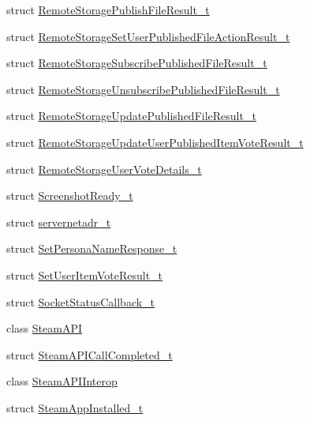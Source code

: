 \begin{DoxyCompactItemize}
\item 
struct \hyperlink{structValve_1_1Steamworks_1_1RemoteStoragePublishFileResult__t}{Remote\+Storage\+Publish\+File\+Result\+\_\+t}
\item 
struct \hyperlink{structValve_1_1Steamworks_1_1RemoteStorageSetUserPublishedFileActionResult__t}{Remote\+Storage\+Set\+User\+Published\+File\+Action\+Result\+\_\+t}
\item 
struct \hyperlink{structValve_1_1Steamworks_1_1RemoteStorageSubscribePublishedFileResult__t}{Remote\+Storage\+Subscribe\+Published\+File\+Result\+\_\+t}
\item 
struct \hyperlink{structValve_1_1Steamworks_1_1RemoteStorageUnsubscribePublishedFileResult__t}{Remote\+Storage\+Unsubscribe\+Published\+File\+Result\+\_\+t}
\item 
struct \hyperlink{structValve_1_1Steamworks_1_1RemoteStorageUpdatePublishedFileResult__t}{Remote\+Storage\+Update\+Published\+File\+Result\+\_\+t}
\item 
struct \hyperlink{structValve_1_1Steamworks_1_1RemoteStorageUpdateUserPublishedItemVoteResult__t}{Remote\+Storage\+Update\+User\+Published\+Item\+Vote\+Result\+\_\+t}
\item 
struct \hyperlink{structValve_1_1Steamworks_1_1RemoteStorageUserVoteDetails__t}{Remote\+Storage\+User\+Vote\+Details\+\_\+t}
\item 
struct \hyperlink{structValve_1_1Steamworks_1_1ScreenshotReady__t}{Screenshot\+Ready\+\_\+t}
\item 
struct \hyperlink{structValve_1_1Steamworks_1_1servernetadr__t}{servernetadr\+\_\+t}
\item 
struct \hyperlink{structValve_1_1Steamworks_1_1SetPersonaNameResponse__t}{Set\+Persona\+Name\+Response\+\_\+t}
\item 
struct \hyperlink{structValve_1_1Steamworks_1_1SetUserItemVoteResult__t}{Set\+User\+Item\+Vote\+Result\+\_\+t}
\item 
struct \hyperlink{structValve_1_1Steamworks_1_1SocketStatusCallback__t}{Socket\+Status\+Callback\+\_\+t}
\item 
class \hyperlink{classValve_1_1Steamworks_1_1SteamAPI}{Steam\+A\+P\+I}
\item 
struct \hyperlink{structValve_1_1Steamworks_1_1SteamAPICallCompleted__t}{Steam\+A\+P\+I\+Call\+Completed\+\_\+t}
\item 
class \hyperlink{classValve_1_1Steamworks_1_1SteamAPIInterop}{Steam\+A\+P\+I\+Interop}
\item 
struct \hyperlink{structValve_1_1Steamworks_1_1SteamAppInstalled__t}{Steam\+App\+Installed\+\_\+t}

\end{DoxyCompactItemize}

